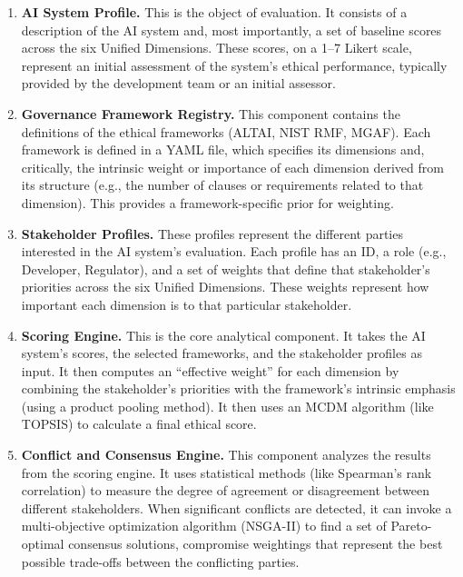 \begin{enumerate}[leftmargin=2em]
  \item \textbf{AI System Profile.} This is the object of evaluation. It consists of a description of the AI system and, most importantly, a set of baseline scores across the six Unified Dimensions. These scores, on a 1--7 Likert scale, represent an initial assessment of the system's ethical performance, typically provided by the development team or an initial assessor.

  \item \textbf{Governance Framework Registry.} This component contains the definitions of the ethical frameworks (ALTAI, NIST RMF, MGAF). Each framework is defined in a YAML file, which specifies its dimensions and, critically, the intrinsic weight or importance of each dimension derived from its structure (e.g., the number of clauses or requirements related to that dimension). This provides a framework-specific prior for weighting.

  \item \textbf{Stakeholder Profiles.} These profiles represent the different parties interested in the AI system's evaluation. Each profile has an ID, a role (e.g., Developer, Regulator), and a set of weights that define that stakeholder's priorities across the six Unified Dimensions. These weights represent how important each dimension is to that particular stakeholder.

  \item \textbf{Scoring Engine.} This is the core analytical component. It takes the AI system's scores, the selected frameworks, and the stakeholder profiles as input. It then computes an \enquote{effective weight} for each dimension by combining the stakeholder's priorities with the framework's intrinsic emphasis (using a product pooling method). It then uses an MCDM algorithm (like TOPSIS) to calculate a final ethical score.

  \item \textbf{Conflict and Consensus Engine.} This component analyzes the results from the scoring engine. It uses statistical methods (like Spearman's rank correlation) to measure the degree of agreement or disagreement between different stakeholders. When significant conflicts are detected, it can invoke a multi-objective optimization algorithm (NSGA-II) to find a set of Pareto-optimal consensus solutions, compromise weightings that represent the best possible trade-offs between the conflicting parties.
\end{enumerate}

